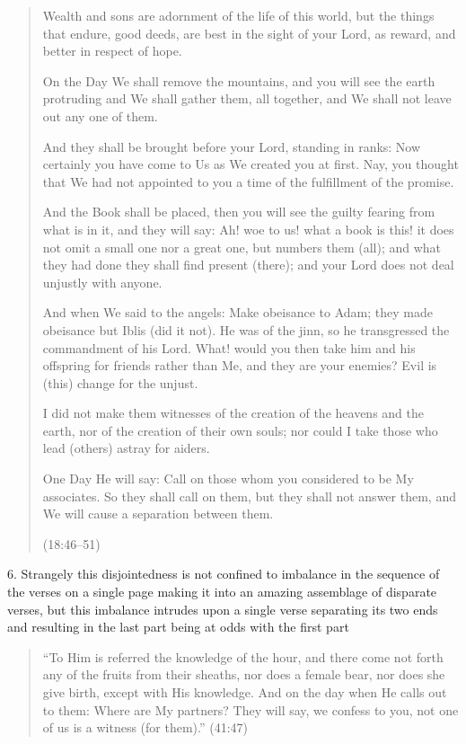 \documentclass[12pt]{memoir}
\newcommand{\QRef}[1]{{\color{darkblue}#1}}
\begin{document}
\begin{quote}
Wealth and sons are adornment of the life of this world,
but the things that endure, good deeds, are best in the sight of your Lord,
as reward, and better in respect of hope.

On the Day We shall remove the mountains,
and you will see the earth protruding and We shall gather them,
all together, and We shall not leave out any one of them.

And they shall be brought before your Lord, standing in ranks:
Now certainly you have come to Us as We created you at first.
Nay, you thought that We had not appointed to you
a time of the fulfillment of the promise.

And the Book shall be placed,
then you will see the guilty fearing from what is in it, and they will say:
Ah! woe to us! what a book is this!
it does not omit a small one nor a great one, but numbers them (all);
and what they had done they shall find present (there);
and your Lord does not deal unjustly with anyone.

And when We said to the angels: Make obeisance to Adam;
they made obeisance but Iblis (did it not).
He was of the jinn, so he transgressed the commandment of his Lord.
What! would you then take him and his offspring for friends rather than Me,
and they are your enemies?
Evil is (this) change for the unjust.

I did not make them witnesses of the creation of the heavens and the earth,
nor of the creation of their own souls;
nor could I take those who lead (others) astray for aiders.

One Day He will say: Call on those whom you considered to be My associates.
So they shall call on them, but they shall not answer them,
and We will cause a separation between them.

(\QRef{18:46–51})
\end{quote}

6. Strangely this disjointedness is not confined to imbalance
in the sequence of the verses on a single page making it
into an amazing assemblage of disparate verses,
but this imbalance intrudes upon a single verse separating its two ends
and resulting in the last part being at odds with the first part

\begin{quote}
“To Him is referred the knowledge of the hour,
and there come not forth any of the fruits from their sheaths,
nor does a female bear, nor does she give birth, except with His knowledge.
And on the day when He calls out to them: Where are My partners?
They will say, we confess to you, not one of us is a witness (for them).”
(\QRef{41:47})
\end{quote}
\end{document}
